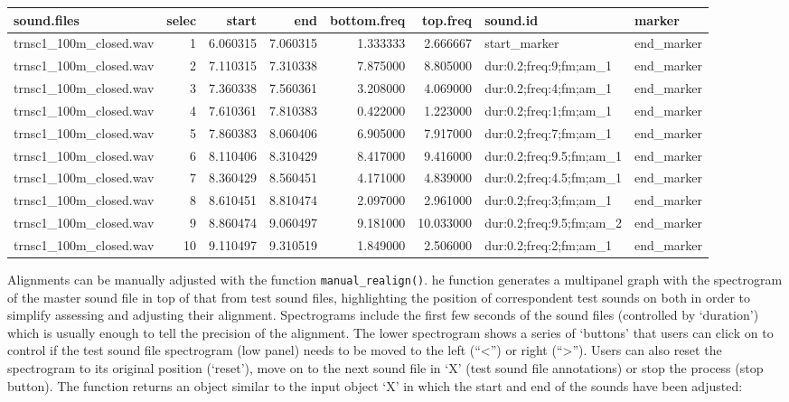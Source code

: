\documentclass[
  letterpaper,
  DIV=11,
  numbers=noendperiod]{scrartcl}
\begin{document}
\begin{landscape}
\begin{longtable*}[t]{lrrrrrll}
\toprule
sound.files & selec & start & end & bottom.freq & top.freq & sound.id & marker\\
\midrule
trnsc1\_100m\_closed.wav & 1 & 6.060315 & 7.060315 & 1.333333 & 2.666667 & start\_marker & end\_marker\\
trnsc1\_100m\_closed.wav & 2 & 7.110315 & 7.310338 & 7.875000 & 8.805000 & dur:0.2;freq:9;fm;am\_1 & end\_marker\\
trnsc1\_100m\_closed.wav & 3 & 7.360338 & 7.560361 & 3.208000 & 4.069000 & dur:0.2;freq:4;fm;am\_1 & end\_marker\\
trnsc1\_100m\_closed.wav & 4 & 7.610361 & 7.810383 & 0.422000 & 1.223000 & dur:0.2;freq:1;fm;am\_1 & end\_marker\\
trnsc1\_100m\_closed.wav & 5 & 7.860383 & 8.060406 & 6.905000 & 7.917000 & dur:0.2;freq:7;fm;am\_1 & end\_marker\\
\addlinespace
trnsc1\_100m\_closed.wav & 6 & 8.110406 & 8.310429 & 8.417000 & 9.416000 & dur:0.2;freq:9.5;fm;am\_1 & end\_marker\\
trnsc1\_100m\_closed.wav & 7 & 8.360429 & 8.560451 & 4.171000 & 4.839000 & dur:0.2;freq:4.5;fm;am\_1 & end\_marker\\
trnsc1\_100m\_closed.wav & 8 & 8.610451 & 8.810474 & 2.097000 & 2.961000 & dur:0.2;freq:3;fm;am\_1 & end\_marker\\
trnsc1\_100m\_closed.wav & 9 & 8.860474 & 9.060497 & 9.181000 & 10.033000 & dur:0.2;freq:9.5;fm;am\_2 & end\_marker\\
trnsc1\_100m\_closed.wav & 10 & 9.110497 & 9.310519 & 1.849000 & 2.506000 & dur:0.2;freq:2;fm;am\_1 & end\_marker\\
\bottomrule
\end{longtable*}
\end{landscape}

Alignments can be manually adjusted with the function
\texttt{manual\_realign()}. he function generates a multipanel graph
with the spectrogram of the master sound file in top of that from test
sound files, highlighting the position of correspondent test sounds on
both in order to simplify assessing and adjusting their alignment.
Spectrograms include the first few seconds of the sound files
(controlled by `duration') which is usually enough to tell the precision
of the alignment. The lower spectrogram shows a series of `buttons' that
users can click on to control if the test sound file spectrogram (low
panel) needs to be moved to the left (``\textless{}'') or right
(``\textgreater{}''). Users can also reset the spectrogram to its
original position (`reset'), move on to the next sound file in `X' (test
sound file annotations) or stop the process (stop button). The function
returns an object similar to the input object `X' in which the start and
end of the sounds have been adjusted:
\end{document}
